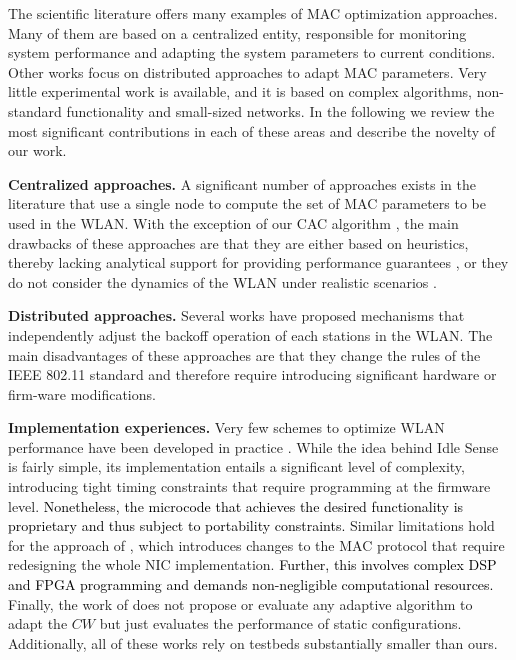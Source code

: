 \documentclass[a4paper,10pt]{article}
\newcommand{\revs}[1]{\textcolor{black}{#1}}
\begin{document}
The scientific literature offers many examples of MAC optimization approaches. Many of them are based on a centralized entity, responsible for monitoring system performance and adapting the system parameters to current conditions. Other works focus on distributed approaches to adapt MAC parameters. Very little experimental work is available, and it is based on complex algorithms, non-standard functionality and small-sized networks. In the following we review the most significant contributions in each of these areas and describe the novelty of our work. 

\vspace{0.5em}
{\bf Centralized approaches.} A significant number of approaches exists in the literature \cite{freitag06,nafaa05,siris06,patras09monet} that use a single node to compute the set of MAC parameters to be used in the WLAN. With the exception of our CAC algorithm \cite{patras09monet}, the main drawbacks of these approaches are that they are either based on heuristics, thereby lacking analytical support for providing performance guarantees \cite{freitag06,nafaa05}, or they do not consider the dynamics of the WLAN under realistic scenarios \cite{siris06}.

\vspace{0.5em}
{\bf Distributed approaches.} Several works \cite{yang07,ni03,heusse05,AOBorig,cali00} have proposed mechanisms that independently adjust the backoff operation of each stations in the WLAN. The main disadvantages of these approaches are that they change the rules of the IEEE 802.11 standard and therefore require introducing significant hardware or firm-ware modifications.

\vspace{0.5em}
{\bf Implementation experiences.} Very few schemes to optimize WLAN performance have been developed in practice \cite{siris06,AOBimpl,idle07}. While the idea behind Idle Sense \cite{heusse05} is fairly simple, its implementation \cite{idle07} entails a significant level of complexity, introducing tight timing constraints that require programming at the firmware level. \revs{Nonetheless, the microcode that achieves the desired functionality is proprietary and thus subject to portability constraints.} Similar limitations hold for the approach of \cite{AOBimpl}, which introduces changes to the MAC protocol that require redesigning the whole NIC implementation. \revs{Further, this involves complex DSP and FPGA programming and demands non-negligible computational resources.} Finally, the work of \cite{siris06} does not propose or evaluate any adaptive algorithm to adapt the $CW$ but just evaluates the performance of static configurations. Additionally, all of these works rely on testbeds substantially smaller than ours. 
\end{document}
